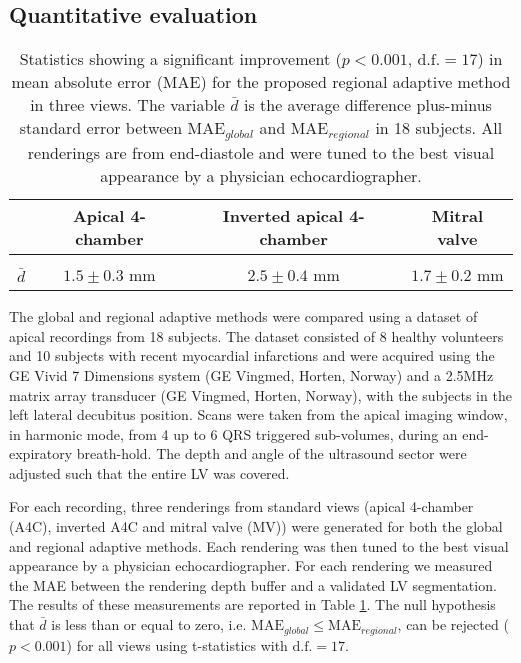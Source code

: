 \subsection{Quantitative evaluation}
\begin{table}
\begin{center}
\begin{tabular}{c|ccc}
& Apical 4-chamber & Inverted apical 4-chamber & Mitral valve \\ \hline \\[-1.5ex]
$\bar{d}$ & $1.5 \pm 0.3$ mm & $2.5 \pm 0.4$ mm & $1.7 \pm 0.2$ mm\\ 
\end{tabular}
\end{center}
\caption[]{\label{tab:stat1} Statistics showing a significant improvement ($p < 0.001$, $\textrm{d.f.} = 17$) in mean absolute error (MAE) for the proposed regional adaptive method in three views. The variable $\bar{d}$ is the average difference plus-minus standard error between $\textrm{MAE}_{global}$ and $\textrm{MAE}_{regional}$ in 18 subjects.
All renderings are from end-diastole and were tuned to the best visual appearance by a physician echocardiographer.}
\end{table}
The global and regional adaptive methods were compared using a dataset of apical recordings from 18 subjects. The dataset consisted of 8 healthy volunteers and 10 subjects with recent myocardial infarctions and were acquired using the GE Vivid 7 Dimensions system (GE Vingmed, Horten, Norway) and a 2.5MHz matrix array transducer (GE Vingmed, Horten, Norway), with the subjects in the left lateral decubitus position. Scans were taken from the apical imaging
window, in harmonic mode, from 4 up to 6 QRS triggered sub-volumes, during an end-expiratory breath-hold. The depth and angle of the ultrasound sector were adjusted such that the entire LV was covered.

For each recording, three renderings from standard views (apical 4-chamber (A4C), inverted A4C and mitral valve (MV)) were generated for both the global and regional adaptive methods. Each rendering was then tuned to the best visual appearance by a physician echocardiographer. For each rendering we measured the MAE between the rendering depth buffer and a validated LV segmentation. The results of these measurements are reported in Table \ref{tab:stat1}. The null hypothesis that $\bar{d}$ is less than or equal to zero, i.e. $\textrm{MAE}_{global} \le \textrm{MAE}_{regional}$, can be rejected ($p < 0.001$) for all views using t-statistics with $\textrm{d.f.} = 17$.

